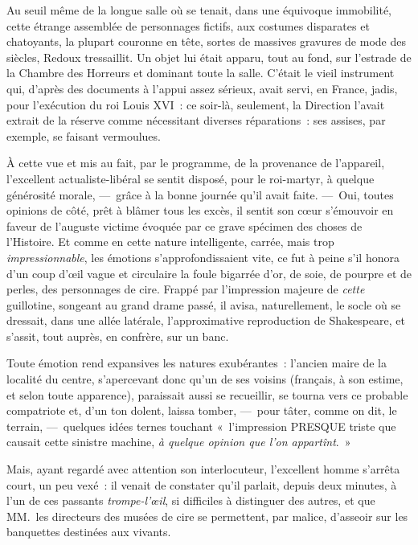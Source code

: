 \documentclass[french,twoside]{book} %
\begin{document}
Au seuil même de la longue salle où se tenait, dans une équivoque immobilité, cette étrange assemblée de personnages fictifs, aux costumes disparates et chatoyants, la plupart couronne en tête, sortes de massives gravures   de mode des siècles, Redoux tressaillit. Un objet lui était apparu, tout au fond, sur l’estrade de la Chambre des Horreurs et dominant toute la salle. C’était le vieil instrument qui, d’après des documents à l’appui assez sérieux, avait servi, en France, jadis, pour l’exécution du roi Louis XVI : ce soir-là, seulement, la Direction l’avait extrait de la réserve comme nécessitant diverses réparations : ses assises, par exemple, se faisant vermoulues.\par
À cette vue et mis au fait, par le programme, de la provenance de l’appareil, l’excellent actualiste-libéral se sentit disposé, pour le roi-martyr, à quelque générosité morale, — grâce à la bonne journée qu’il avait faite. — Oui, toutes opinions de côté, prêt à blâmer tous les excès, il sentit son cœur s’émouvoir en faveur de l’auguste victime évoquée par ce grave spécimen des choses de l’Histoire. Et comme en cette nature intelligente, carrée, mais trop \emph{impressionnable}, les émotions s’approfondissaient vite, ce fut à peine s’il honora d’un coup d’œil vague et circulaire la foule bigarrée d’or, de   soie, de pourpre et de perles, des personnages de cire. Frappé par l’impression majeure de \emph{cette} guillotine, songeant au grand drame passé, il avisa, naturellement, le socle où se dressait, dans une allée latérale, l’approximative reproduction de Shakespeare, et s’assit, tout auprès, en confrère, sur un banc.\par
Toute émotion rend expansives les natures exubérantes : l’ancien maire de la localité du centre, s’apercevant donc qu’un de ses voisins (français, à son estime, et selon toute apparence), paraissait aussi se recueillir, se tourna vers ce probable compatriote et, d’un ton dolent, laissa tomber, — pour tâter, comme on dit, le terrain, — quelques idées ternes touchant « l’impression PRESQUE triste que causait cette sinistre machine, \emph{à quelque opinion que l’on appartînt}. »\par
Mais, ayant regardé avec attention son interlocuteur, l’excellent homme s’arrêta court, un peu vexé : il venait de constater qu’il parlait, depuis deux minutes, à l’un de ces passants \emph{trompe-l’œil}, si difficiles à distinguer des autres,   et que MM. les directeurs des musées de cire se permettent, par malice, d’asseoir sur les banquettes destinées aux vivants.\par
\end{document}
